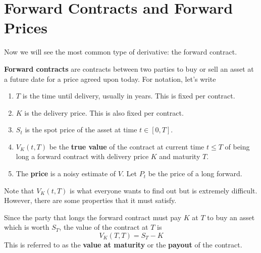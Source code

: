 \documentclass{article}
\begin{document}
\section{Forward Contracts and Forward Prices} 

    Now we will see the most common type of derivative: the forward contract. 

    \begin{definition}
      \textbf{Forward contracts} are contracts between two parties to buy or sell an asset at a future date for a price agreed upon today. For notation, let's write
      \begin{enumerate}
        \item $T$ is the time until delivery, usually in years. This is fixed per contract.
        \item $K$ is the delivery price. This is also fixed per contract. 
        \item $S_t$ is the spot price of the asset at time $t \in [0, T]$.
        \item $V_{K} (t, T)$ be the \textbf{true value} of the contract at current time $t \leq T$ of being long a forward contract with delivery price $K$ and maturity $T$. 
        \item The \textbf{price} is a noisy estimate of $V$. Let $P_t$ be the price of a long forward. 
      \end{enumerate}
    \end{definition}

    Note that $V_K (t, T)$ is what everyone wants to find out but is extremely difficult. However, there are some properties that it must satisfy. 

    \begin{lemma}
      Since the party that longs the forward contract must pay $K$ at $T$ to buy an asset which is worth $S_T$, the value of the contract at $T$ is 
      \begin{equation}
        V_K (T, T) = S_T - K
      \end{equation}
      This is referred to as the \textbf{value at maturity} or the \textbf{payout} of the contract.
    \end{lemma}
\end{document}
